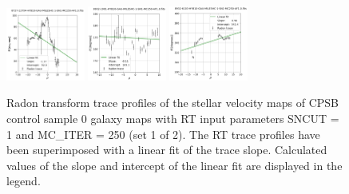 \documentclass[fleqn,usenatbib]{mnras}
\begin{document}
\begin{figure}
    \includegraphics[width=0.23\textwidth]{Images/LINFITS/CC0-8727-12704-LINFIT-EBARS-MASKED.png}
    \includegraphics[width=0.23\textwidth]{Images/LINFITS/CC0-8932-1901-LINFIT-EBARS-MASKED.png}
    \includegraphics[width=0.23\textwidth]{Images/LINFITS/CC0-8932-6103-LINFIT-EBARS-MASKED.png}
%
    \caption{Radon transform trace profiles of the stellar velocity maps of CPSB control sample 0 galaxy maps with RT input parameters SNCUT = 1 and MC\_ITER = 250 (set 1 of 2). The RT trace profiles have been superimposed with a linear fit of the trace slope. Calculated values of the slope and intercept of the linear fit are displayed in the legend.}
    \label{fig:Radon-traces-CC0-LINFITS-1}
\end{figure}
\end{document}
